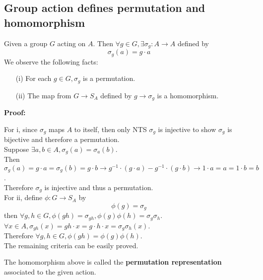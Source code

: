 \documentclass{article}
\begin{document}
\subsection*{Group action defines permutation and homomorphism}
Given a group $G$ acting on $A$. Then $\forall g \in G, \exists \sigma_g: A \rightarrow A$ defined by
\begin{equation*}
    \sigma_g(a) = g\cdot a
\end{equation*}
We observe the following facts:
\begin{itemize}
    \item[(i)] For each $g\in G, \sigma_g$ is a permutation.
    \item[(ii)] The map from $G \rightarrow S_A$ defined by $g \rightarrow \sigma_g$ is a homomorphism.
\end{itemize}
\textbf{Proof:}
\begin{addmargin}[1em]{0em}
    For i, since $\sigma_g$ maps $A$ to itself, then only NTS $\sigma_g$ is injective to show $\sigma_g$ is bijective and therefore a permutation.\\
    Suppose $\exists a, b \in A, \sigma_g(a) = \sigma_a(b)$.\\
    Then $\sigma_g(a) = g\cdot a = \sigma_g(b) = g\cdot b \rightarrow g^{-1}\cdot (g\cdot a) - g^{-1}\cdot (g\cdot b) \rightarrow 1\cdot a = a = 1\cdot b = b$.\\
    Therefore $\sigma_g$ is injective and thus a permutation.\\
    For ii, define $\phi:G \rightarrow S_A$ by
    \begin{equation*}
        \phi(g) = \sigma_g
    \end{equation*}
    then $\forall g, h \in G, \phi(gh) = \sigma_{gh}, \phi(g)\phi(h) = \sigma_g\sigma_h$.\\
    $\forall x \in A, \sigma_{gh}(x) = gh\cdot x = g\cdot h\cdot x = \sigma_g\sigma_h(x)$.\\
    Therefore $\forall g, h \in G, \phi(gh) = \phi(g)\phi(h)$.\\
    The remaining criteria can be easily proved.
\end{addmargin}
The homomorphism above is called the \textbf{permutation representation} associated to the given action.
\end{document}
